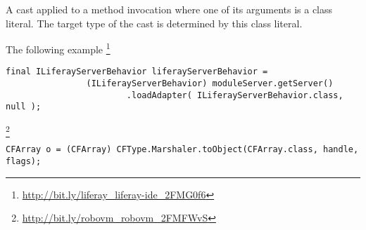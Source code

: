 A cast applied to a method invocation where one of its arguments is a class literal.
The target type of the cast is determined by this class literal.

\instances{}
The following example 
\footnote{\url{http://bit.ly/liferay_liferay-ide_2FMG0f6}}

\begin{verbatim}
final ILiferayServerBehavior liferayServerBehavior =
                (ILiferayServerBehavior) moduleServer.getServer()
                        .loadAdapter( ILiferayServerBehavior.class, null );
\end{verbatim}


\footnote{\url{http://bit.ly/robovm_robovm_2FMFWvS}}

\begin{verbatim}
CFArray o = (CFArray) CFType.Marshaler.toObject(CFArray.class, handle, flags);
\end{verbatim} 
